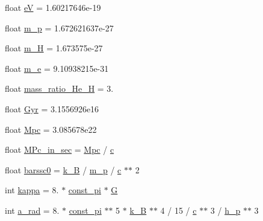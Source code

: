 \begin{DoxyCompactItemize}
\item 
float \mbox{\hyperlink{namespacecamb_1_1constants_a34ae77e0e8e8d03ee9728ecf48397174}{eV}} = 1.\+60217646e-\/19
\item 
float \mbox{\hyperlink{namespacecamb_1_1constants_a46a0d5c81f78ddacabc8b8934ef83ce0}{m\+\_\+p}} = 1.\+672621637e-\/27
\item 
float \mbox{\hyperlink{namespacecamb_1_1constants_a552b42ed255928f3004da11e1323a0fb}{m\+\_\+H}} = 1.\+673575e-\/27
\item 
float \mbox{\hyperlink{namespacecamb_1_1constants_a032e7b8bd00a45909d2e468080381ea1}{m\+\_\+e}} = 9.\+10938215e-\/31
\item 
float \mbox{\hyperlink{namespacecamb_1_1constants_af0ba9478822efdf416b388686de44391}{mass\+\_\+ratio\+\_\+\+He\+\_\+H}} = 3.
\item 
float \mbox{\hyperlink{namespacecamb_1_1constants_ac84d257ae498484bfa842b31e8b3f049}{Gyr}} = 3.\+1556926e16
\item 
float \mbox{\hyperlink{namespacecamb_1_1constants_abb7b37c556aa13e06d66456318a319c3}{Mpc}} = 3.\+085678e22
\item 
float \mbox{\hyperlink{namespacecamb_1_1constants_a06b4573b5a8bbe0912b23507b6935679}{M\+Pc\+\_\+in\+\_\+sec}} = \mbox{\hyperlink{namespacecamb_1_1constants_abb7b37c556aa13e06d66456318a319c3}{Mpc}} / \mbox{\hyperlink{namespacecamb_1_1constants_a08e77640ea70d03f8c60ba9f7f2644b9}{c}}
\item 
float \mbox{\hyperlink{namespacecamb_1_1constants_a22858197d795f4639a5aa73400d495ea}{barssc0}} = \mbox{\hyperlink{namespacecamb_1_1constants_af524d81ee3b1617ff9509b924eae87cd}{k\+\_\+B}} / \mbox{\hyperlink{namespacecamb_1_1constants_a46a0d5c81f78ddacabc8b8934ef83ce0}{m\+\_\+p}} / \mbox{\hyperlink{namespacecamb_1_1constants_a08e77640ea70d03f8c60ba9f7f2644b9}{c}} $\ast$$\ast$ 2
\item 
int \mbox{\hyperlink{namespacecamb_1_1constants_ad820330cceb6ab8ae9fc124bc25bbd2f}{kappa}} = 8. $\ast$ \mbox{\hyperlink{namespacecamb_1_1constants_a1020ead9e0e4db6bc81ad82aa777cd28}{const\+\_\+pi}} $\ast$ \mbox{\hyperlink{namespacecamb_1_1constants_a8ecaeb4a72719c13ff41d52253539559}{G}}
\item 
int \mbox{\hyperlink{namespacecamb_1_1constants_a09428c5382962f64116178df09f92544}{a\+\_\+rad}} = 8. $\ast$ \mbox{\hyperlink{namespacecamb_1_1constants_a1020ead9e0e4db6bc81ad82aa777cd28}{const\+\_\+pi}} $\ast$$\ast$ 5 $\ast$ \mbox{\hyperlink{namespacecamb_1_1constants_af524d81ee3b1617ff9509b924eae87cd}{k\+\_\+B}} $\ast$$\ast$ 4 / 15 / \mbox{\hyperlink{namespacecamb_1_1constants_a08e77640ea70d03f8c60ba9f7f2644b9}{c}} $\ast$$\ast$ 3 / \mbox{\hyperlink{namespacecamb_1_1constants_ab268b921161c6a8a467bda8f21df3d17}{h\+\_\+p}} $\ast$$\ast$ 3
$$
\end{DoxyCompactItemize}
